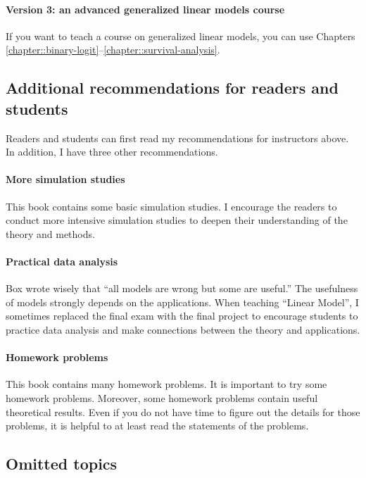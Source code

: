 \paragraph*{Version 3: an advanced generalized linear models course} 
If you want to teach a course on generalized linear models, you can use Chapters \ref{chapter::binary-logit}--\ref{chapter::survival-analysis}. 







\subsection*{Additional recommendations for readers and students}



Readers and students can first read my recommendations for instructors above.  In addition, I have three other recommendations. 


\paragraph*{More simulation studies}
This book contains some basic simulation studies. I encourage the readers to conduct more intensive simulation studies to deepen their understanding of the theory and methods. 


\paragraph*{Practical data analysis}
Box wrote wisely that ``all models are wrong but some are useful.'' The usefulness of models strongly depends on the applications. When teaching ``Linear Model'', I sometimes replaced the final exam with the final project to encourage students to practice data analysis and make connections between the theory and applications.


\paragraph*{Homework problems}
This book contains many homework problems. It is important to try some homework problems. Moreover, some homework problems contain useful theoretical results. Even if you do not have time to figure out the details for those problems,  it is helpful to at least read the statements of the problems.  



\subsection*{Omitted topics}



